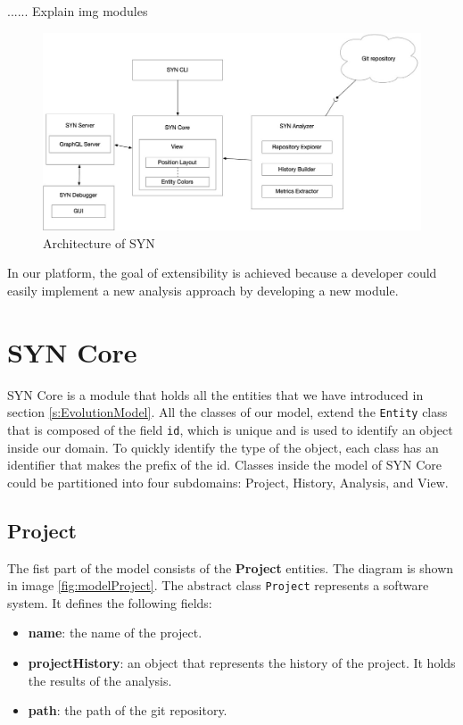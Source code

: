 ...... Explain img modules


\begin{figure}
    \center
    \includegraphics[width=\textwidth]{SYNArchitecture.jpg}
    \caption{Architecture of SYN}
    \label{fig:architecture}
\end{figure}


In our platform, the goal of extensibility is achieved because a developer could easily implement a new analysis approach by developing a new module. 

\section{SYN Core}
SYN Core is a module that holds all the entities that we have introduced in section \ref{s:EvolutionModel}. 
All the classes of our model, extend the \texttt{Entity} class that is composed of the field \texttt{id}, which is unique and is used to identify an object inside our domain. 
To quickly identify the type of the object, each class has an identifier that makes the prefix of the id. 
Classes inside the model of SYN Core could be partitioned into four subdomains: Project, History, Analysis, and View. 

\subsection*{Project}
The fist part of the model consists of the \textbf{Project} entities. 
The diagram is shown in image \ref{fig:modelProject}. The abstract class \texttt{Project} represents a software system. It defines the following fields:
\begin{itemize}
    \item \textbf{name}: the name of the project.
    \item \textbf{projectHistory}: an object that represents the history of the project. It holds the results of the analysis. 
    \item \textbf{path}: the path of the git repository. 
\end{itemize}

